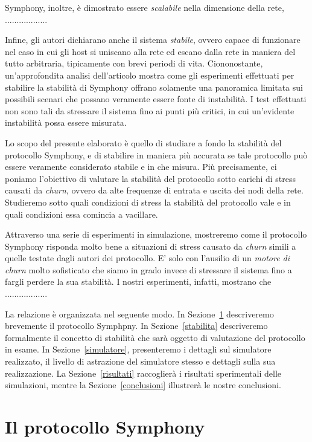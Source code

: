 \documentclass[prodmode,acmtap]{acmlarge}
\begin{document}
Symphony, inoltre, è dimostrato essere \emph{scalabile} nella dimensione della rete, ..................

Infine, gli autori dichiarano anche il sistema \emph{stabile}, ovvero capace di funzionare nel caso in cui gli host si uniscano alla rete ed escano dalla rete in maniera del tutto arbitraria, tipicamente con brevi periodi di vita. Ciononostante, un'approfondita analisi dell'articolo mostra come gli esperimenti effettuati per stabilire la stabilità di Symphony offrano solamente una panoramica limitata sui possibili scenari che possano veramente essere fonte di instabilità. I test effettuati non sono tali da stressare il sistema fino ai punti più critici, in cui un'evidente instabilità possa essere misurata.

Lo scopo del presente elaborato è quello di studiare a fondo la stabilità del protocollo Symphony, e di stabilire in maniera più accurata se tale protocollo può essere veramente considerato stabile e in che misura. Più precisamente, ci poniamo l'obiettivo di valutare la stabilità del protocollo sotto carichi di stress causati da \emph{churn}, ovvero da alte frequenze di entrata e uscita dei nodi della rete. Studieremo sotto quali condizioni di stress la stabilità del protocollo vale e in quali condizioni essa comincia a vacillare.

Attraverso una serie di esperimenti in simulazione, mostreremo come il protocollo Symphony risponda molto bene a situazioni di stress causato da \emph{churn} simili a quelle testate dagli autori dei protocollo. E' solo con l'ausilio di un \emph{motore di churn} molto sofisticato che siamo in grado invece di stressare il sistema fino a fargli perdere la sua stabilità. I nostri esperimenti, infatti, mostrano che ..................

La relazione è organizzata nel seguente modo. In Sezione~\ref{symphony} descriveremo brevemente il protocollo Symphpny. In Sezione~\ref{stabilita} descriveremo formalmente il concetto di stabilità che sarà oggetto di valutazione del protocollo in esame. In Sezione~\ref{simulatore}, presenteremo i dettagli sul simulatore realizzato, il livello di astrazione del simulatore stesso e dettagli sulla sua realizzazione. La Sezione~\ref{risultati} raccoglierà i risultati sperimentali delle simulazioni, mentre la Sezione~\ref{conclusioni} illustrerà le nostre conclusioni.



\section{Il protocollo Symphony} \label{symphony}
\end{document}

